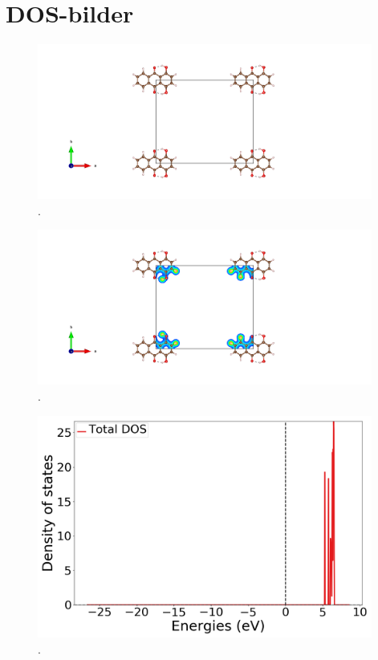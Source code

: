 \documentclass{article}
\begin{document}
\vspace{1cm}

\section{DOS-bilder}

  \begin{figure}[H]
      \centering
      \includegraphics[width = 11cm]{../fig/DOS_CONTCAR.png}
      \caption{. }
      \label{fig:DOS_CONTCAR}
  \end{figure}

  \begin{figure}[H]
      \centering
      \includegraphics[width = 11cm]{../fig/DOS_CHGCAR.png}
      \caption{. }
      \label{fig:DOS_CHGCAR}
  \end{figure}

  \begin{figure}[H]
      \centering
      \includegraphics[width = 11cm]{../fig/DOS_k4_TDOS_1.png}
      \caption{. }
      \label{fig:DOS_k4_TDOS_1}
  \end{figure}
\end{document}
